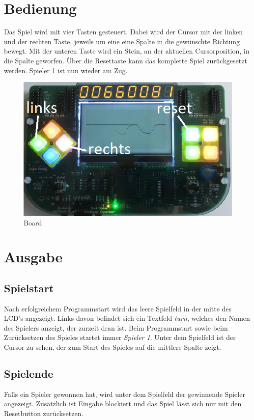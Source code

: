 \section{Bedienung}
    Das Spiel wird mit vier Tasten gesteuert.
    Dabei wird der Cursor mit der linken und der rechten Taste, jeweils um eine eine Spalte in die gewünschte Richtung bewegt.
    Mit der unteren Taste wird ein Stein, an der aktuellen Cursorposition, in die Spalte geworfen.
    Über die Resettaste kann das komplette Spiel zurückgesetzt werden. Spieler 1 ist nun wieder am Zug.
    \begin{figure}[H]
        \centering
        \includegraphics[scale=0.5]{img/board.png}    
        \caption{Board}
        \label{fig:board}
    \end{figure}

\section{Ausgabe}
    \subsection{Spielstart}
        Nach erfolgreichem Programmstart wird das leere Spielfeld in der mitte des LCD's angezeigt.
        Links davon befindet sich ein Textfeld \textit{turn}, welches den Namen des Spielers anzeigt, der zurzeit dran ist.
        Beim Programmstart sowie beim Zurücksetzen des Spieles startet immer \textit{Spieler 1}.
        Unter dem Spielfeld ist der Cursor zu sehen, der zum Start des Spieles auf die mittlere Spalte zeigt.
    \subsection{Spielende}
        Falls ein Spieler gewonnen hat, wird unter dem Spielfeld der gewinnende Spieler angezeigt.
        Zusätzlich ist Eingabe blockiert und das Spiel lässt sich nur mit den Resetbutton zurücksetzen.




